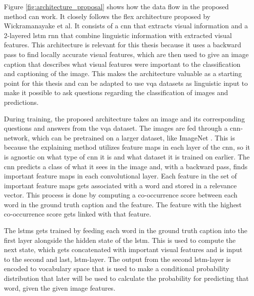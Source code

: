         Figure \ref{fig:architecture_proposal} shows how the data flow in the proposed method can work. It closely follows the \gls{flex} \cite{wickramanayakeFLEXFaithfulLinguistic2019} architecture proposed by Wickramanayake et al. It consists of a \gls{cnn} that extracts visual information and a 2-layered \gls{lstm} \cite{hochreiterLongShorttermMemory1997} \gls{rnn} that combine linguistic information with extracted visual features. This architecture is relevant for this thesis because it uses a backward pass to find locally accurate visual features, which are then used to give an image caption that describes what visual features were important to the classification and captioning of the image. This makes the architecture valuable as a starting point for this thesis and can be adapted to use \gls{vqa} datasets as linguistic input to make it possible to ask questions regarding the classification of images and predictions. 
        
        During training, the proposed architecture takes an image and its corresponding questions and answers from the \gls{vqa} dataset. The images are fed through a \gls{cnn}-network, which can be pretrained on a larger dataset, like ImageNet \cite{dengImageNetLargeScaleHierarchical2009}. This is because the explaining method utilizes feature maps in each layer of the \gls{cnn}, so it is agnostic on what type of \gls{cnn} it is and what dataset it is trained on earlier. The \gls{cnn} predicts a class of what it sees in the image and, with a backward pass, finds important feature maps in each  convolutional layer. Each feature in the set of important feature maps gets associated with a word and stored in a relevance vector. This process is done by computing a co-occurrence score between each word in the ground truth caption and the feature. The feature with the highest co-occurrence score gets linked with that feature. 
        
        The \glspl{lstm} gets trained by feeding each word in the ground truth caption into the first layer alongside the hidden state of the \gls{lstm}. This is used to compute the next state, which gets concatenated with important visual features and is input to the second and last, \gls{lstm}-layer. 
        The output from the second \gls{lstm}-layer is encoded to vocabulary space that is used to make a conditional probability distribution that later will be used to calculate the probability for predicting that word, given the given image features. 
        
